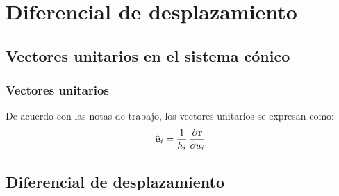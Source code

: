 \documentclass[12pt]{beamer}
\begin{document}
\section{Diferencial de desplazamiento}
\subsection{Vectores unitarios en el sistema cónico}

\begin{frame}
\frametitle{Vectores unitarios}
De acuerdo con las notas de trabajo, los vectores unitarios se expresan como:
\pause
\begin{align*}
\vu{e}_{i} = \dfrac{1}{h_{i}} \, \pdv{\vb{r}}{u_{i}}
\end{align*}
\end{frame}

\subsection{Diferencial de desplazamiento}
\end{document}
